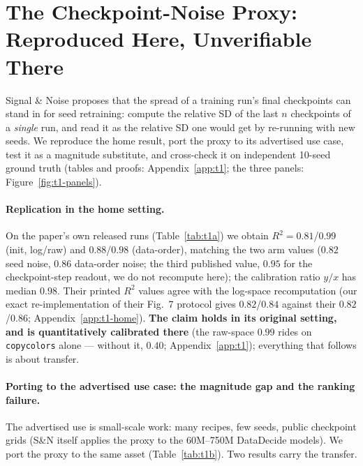 
\section{The Checkpoint-Noise Proxy: Reproduced Here, Unverifiable There}
\label{sec:t1}

Signal \& Noise \citep{signalandnoise2025} proposes that the spread of a training run's final
checkpoints can stand in for seed retraining: compute the relative SD of the last $n$
checkpoints of a \emph{single} run, and read it as the relative SD one would get by re-running
with new seeds. We reproduce the home result, port the proxy to its advertised use case, test it
as a magnitude substitute, and cross-check it on independent 10-seed ground truth (tables and
proofs: Appendix~\ref{app:t1}; the three panels: Figure~\ref{fig:t1-panels}).

\paragraph{Replication in the home setting.}
\label{sec:t1-home}
On the paper's own released runs (Table~\ref{tab:t1a}) we obtain $R^2 = 0.81$/$0.99$ (init,
log/raw) and $0.88$/$0.98$ (data-order), matching the two arm values ($0.82$
seed noise, $0.86$ data-order noise; the third published value, $0.95$ for the
checkpoint-step readout, we do not recompute here); the calibration
ratio $y/x$ has median $0.98$. Their printed $R^2$ values agree with the log-space recomputation (our exact re-implementation of their Fig.\ 7 protocol gives $0.82$/$0.84$ against their $0.82$/$0.86$; Appendix~\ref{app:t1-home}).
\textbf{The claim holds in its original setting, and is
quantitatively calibrated there} (the raw-space $0.99$ rides on \texttt{copycolors} alone --- without it, $0.40$; Appendix~\ref{app:t1}); everything that follows is about transfer.

\paragraph{Porting to the advertised use case: the magnitude gap and the ranking failure.}
\label{sec:t1-port}
The advertised use is small-scale work: many recipes, few seeds, public checkpoint grids
(S\&N itself applies the proxy to the 60M--750M DataDecide models). We
port the proxy to the same asset (Table~\ref{tab:t1b}). Two results carry the transfer.

